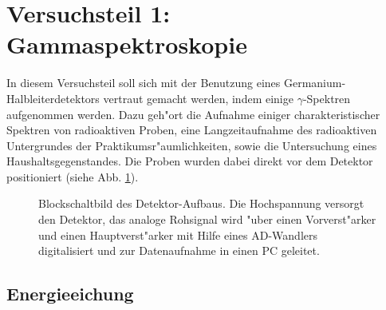 \documentclass[12pt]{article}
\begin{document}
\section{Versuchsteil 1: Gammaspektroskopie}

In diesem Versuchsteil soll sich mit der Benutzung eines Germanium-Halbleiterdetek\-tors vertraut gemacht werden, indem einige $\gamma$-Spektren aufgenommen werden. Dazu geh"ort die Aufnahme einiger charakteristischer Spektren von radioaktiven Proben, eine Langzeitaufnahme des radioaktiven Untergrundes der Praktikumsr"aumlichkeiten, sowie die Untersuchung eines Haushaltsgegenstandes. Die Proben wurden dabei direkt vor dem Detektor positioniert (siehe Abb. \ref{fig:schaltbild}).
\begin{figure}[h]
	\centering
	\caption[Blockschaltbild]{Blockschaltbild des Detektor-Aufbaus. Die Hochspannung versorgt den Detektor, das analoge Rohsignal wird "uber einen Vorverst"arker und einen Hauptverst"arker mit Hilfe eines AD-Wandlers digitalisiert und zur Datenaufnahme in einen PC geleitet.} \label{fig:schaltbild}
\end{figure}
    

\subsection{Energieeichung}
\end{document}
